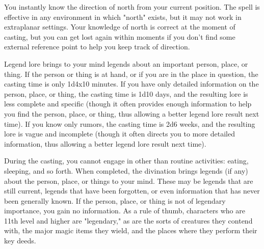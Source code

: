 \begin{multicols}{2}
\begin{small}
\noindent You instantly know the direction of north from your current position. The spell is effective in any environment in which "north" exists, but it may not work in extraplanar settings. Your knowledge of north is correct at the moment of casting, but you can get lost again within moments if you don't find some external reference point to help you keep track of direction.

\noindent Legend lore brings to your mind legends about an important person, place, or thing. If the person or thing is at hand, or if you are in the place in question, the casting time is only 1d4x10 minutes. If you have only detailed information on the person, place, or thing, the casting time is 1d10 days, and the resulting lore is less complete and specific (though it often provides enough information to help you find the person, place, or thing, thus allowing a better legend lore result next time). If you know only rumors, the casting time is 2d6 weeks, and the resulting lore is vague and incomplete (though it often directs you to more detailed information, thus allowing a better legend lore result next time).

\smallskip\noindent During the casting, you cannot engage in other than routine activities: eating, sleeping, and so forth. When completed, the divination brings legends (if any) about the person, place, or things to your mind. These may be legends that are still current, legends that have been forgotten, or even information that has never been generally known. If the person, place, or thing is not of legendary importance, you gain no information. As a rule of thumb, characters who are 11th level and higher are "legendary," as are the sorts of creatures they contend with, the major magic items they wield, and the places where they perform their key deeds.



\end{small}
\end{multicols}
